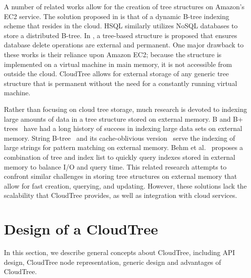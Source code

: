 \documentclass[10pt, conference, compsocconf]{IEEEtran}
\begin{document}
A number of related works allow for the creation of tree structures on
Amazon's EC2 service. The solution proposed in \cite{Wu10} is that of
a dynamic B-tree indexing scheme that resides in the cloud. HSQL
\cite{Chang12} similarly utilizes NoSQL databases to store a
distributed B-tree. In \cite{Mo14}, a tree-based structure is proposed
that ensures database delete operations are external and
permanent. One major drawback to these works is their reliance upon
Amazon EC2; because the structure is implemented on a virtual machine
in main memory, it is not accessible from outside the cloud. CloudTree
allows for external storage of any generic tree structure that is
permanent without the need for a constantly running virtual machine.


Rather than focusing on cloud tree storage, much research is devoted
to indexing large amounts of data in a tree structure stored on
external memory. B and B+ trees~\cite{BM1970} have had a long history of
success in indexing large data sets on external memory.  String
B-tree~\cite{ferragina:string_B-tree} and its cache-oblivious
version~\cite{bender:oblivious-string-B-tree} serve the indexing of
large strings for pattern matching on external memory.  Behm et
al.~\cite{Behm11} proposes a combination of tree and index list to
quickly query indexes stored in external memory to balance I/O and
query time. This related research attempts to confront similar
challenges in storing tree structures on external memory that allow
for fast creation, querying, and updating. However, these solutions
lack the scalability that CloudTree provides, as well as integration
with cloud services.








\section{Design of a CloudTree}
\label{design}
In this section, we describe general concepts about CloudTree,
including API design, CloudTree node representation, generic design and
advantages of CloudTree. 
\end{document}
